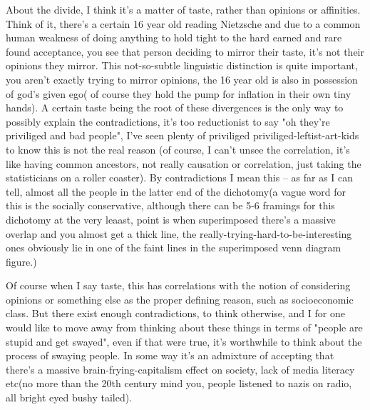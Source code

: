 About the divide, I think it's a matter of taste, rather than opinions or affinities. Think of it, there's a certain 16 year old reading Nietzsche and due to a common human weakness of doing anything to hold tight to the hard earned and rare found acceptance, you see that person deciding to mirror their taste, it's not their opinions they mirror. This not-so-subtle linguistic distinction is quite important, you aren't exactly trying to mirror opinions, the 16 year old is also in possession of god's given ego( of course they hold the pump for inflation in their own tiny hands). A certain taste being the root of these divergences is the only way to possibly explain the contradictions, it's too reductionist to say "oh they're priviliged and bad people", I've seen plenty of priviliged priviliged-leftist-art-kids to know this is not the real reason (of course, I can't unsee the correlation, it's like having common ancestors, not really causation or correlation, just taking the statisticians on a roller coaster). By contradictions I mean this -- as far as I can tell, almost all the people in the latter end of the dichotomy(a vague word for this is the socially conservative, although there can be 5-6 framings for this dichotomy at the very leaast, point is when superimposed there's a massive overlap and you almost get a thick line, the really-trying-hard-to-be-interesting ones obviously lie in one of the faint lines in the superimposed venn diagram figure.)

Of course when I say taste, this has correlations with the notion of considering opinions or something else as the proper defining reason, such as socioeconomic class. But there exist enough contradictions, to think otherwise, and I for one would like to move away from thinking about these things in terms of "people are stupid and get swayed", even if that were true, it's worthwhile to think about the process of swaying people. In some way it's an admixture of accepting that there's a massive brain-frying-capitalism effect on society, lack of media literacy etc(no more than the 20th century mind you, people listened to nazis on radio, all bright eyed bushy tailed). 

